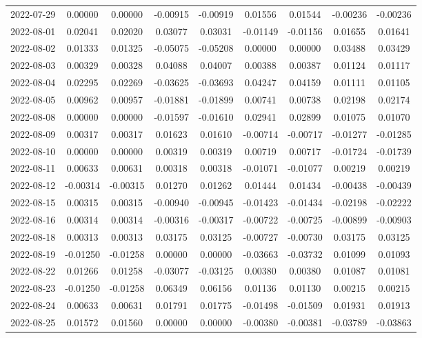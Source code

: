 {\begin{footnotesize}
\begin{longtable}{lcccccccc}
2022-07-29 & 0.00000 & 0.00000 & -0.00915 & -0.00919 & 0.01556 & 0.01544 & -0.00236 & -0.00236 \\
2022-08-01 & 0.02041 & 0.02020 & 0.03077 & 0.03031 & -0.01149 & -0.01156 & 0.01655 & 0.01641 \\
2022-08-02 & 0.01333 & 0.01325 & -0.05075 & -0.05208 & 0.00000 & 0.00000 & 0.03488 & 0.03429 \\
2022-08-03 & 0.00329 & 0.00328 & 0.04088 & 0.04007 & 0.00388 & 0.00387 & 0.01124 & 0.01117 \\
2022-08-04 & 0.02295 & 0.02269 & -0.03625 & -0.03693 & 0.04247 & 0.04159 & 0.01111 & 0.01105 \\
2022-08-05 & 0.00962 & 0.00957 & -0.01881 & -0.01899 & 0.00741 & 0.00738 & 0.02198 & 0.02174 \\
2022-08-08 & 0.00000 & 0.00000 & -0.01597 & -0.01610 & 0.02941 & 0.02899 & 0.01075 & 0.01070 \\
2022-08-09 & 0.00317 & 0.00317 & 0.01623 & 0.01610 & -0.00714 & -0.00717 & -0.01277 & -0.01285 \\
2022-08-10 & 0.00000 & 0.00000 & 0.00319 & 0.00319 & 0.00719 & 0.00717 & -0.01724 & -0.01739 \\
2022-08-11 & 0.00633 & 0.00631 & 0.00318 & 0.00318 & -0.01071 & -0.01077 & 0.00219 & 0.00219 \\
2022-08-12 & -0.00314 & -0.00315 & 0.01270 & 0.01262 & 0.01444 & 0.01434 & -0.00438 & -0.00439 \\
2022-08-15 & 0.00315 & 0.00315 & -0.00940 & -0.00945 & -0.01423 & -0.01434 & -0.02198 & -0.02222 \\
2022-08-16 & 0.00314 & 0.00314 & -0.00316 & -0.00317 & -0.00722 & -0.00725 & -0.00899 & -0.00903 \\
2022-08-18 & 0.00313 & 0.00313 & 0.03175 & 0.03125 & -0.00727 & -0.00730 & 0.03175 & 0.03125 \\
2022-08-19 & -0.01250 & -0.01258 & 0.00000 & 0.00000 & -0.03663 & -0.03732 & 0.01099 & 0.01093 \\
2022-08-22 & 0.01266 & 0.01258 & -0.03077 & -0.03125 & 0.00380 & 0.00380 & 0.01087 & 0.01081 \\
2022-08-23 & -0.01250 & -0.01258 & 0.06349 & 0.06156 & 0.01136 & 0.01130 & 0.00215 & 0.00215 \\
2022-08-24 & 0.00633 & 0.00631 & 0.01791 & 0.01775 & -0.01498 & -0.01509 & 0.01931 & 0.01913 \\
2022-08-25 & 0.01572 & 0.01560 & 0.00000 & 0.00000 & -0.00380 & -0.00381 & -0.03789 & -0.03863 \\

\end{longtable}
\end{footnotesize}}
